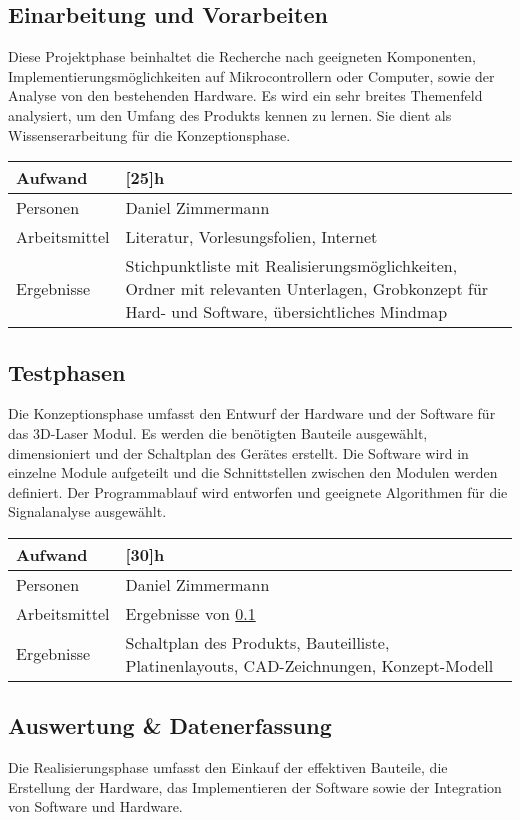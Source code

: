 \subsection{Einarbeitung und Vorarbeiten}
\label{sec:info}
Diese Projektphase beinhaltet die Recherche nach geeigneten Komponenten, Implementierungsmöglichkeiten auf Mikrocontrollern oder Computer, sowie der Analyse von den bestehenden Hardware. Es wird ein sehr breites Themenfeld analysiert, um den Umfang des Produkts kennen zu lernen. Sie dient als Wissenserarbeitung für die Konzeptionsphase. \\
\begin{tabularx}{\textwidth}{|l|X|}
	\hline
	Aufwand & [25]{h} \\ \hline
	Personen & Daniel Zimmermann \\ \hline
	Arbeitsmittel & Literatur, Vorlesungsfolien, Internet \\ \hline
	Ergebnisse & Stichpunktliste mit Realisierungsmöglichkeiten, Ordner mit relevanten Unterlagen, Grobkonzept für Hard- und Software, übersichtliches Mindmap \\ \hline
\end{tabularx}

\subsection{Testphasen}
\label{sec:Testphasen}
Die Konzeptionsphase umfasst den Entwurf der Hardware und der Software für das 3D-Laser Modul. Es werden die benötigten Bauteile ausgewählt, dimensioniert und der Schaltplan des Gerätes erstellt. Die Software wird in einzelne Module aufgeteilt und die Schnittstellen zwischen den Modulen werden definiert. Der Programmablauf wird entworfen und geeignete Algorithmen für die Signalanalyse ausgewählt.\\
\begin{tabularx}{\textwidth}{|l|X|}
	\hline
	Aufwand & [30]{h} \\\hline
	Personen & Daniel Zimmermann \\\hline
	Arbeitsmittel & Ergebnisse von \ref{sec:info} \\\hline
	Ergebnisse & Schaltplan des Produkts, Bauteilliste, Platinenlayouts, CAD-Zeichnungen, Konzept-Modell \\\hline
\end{tabularx}

\subsection{Auswertung \& Datenerfassung}
\label{sec:real}
Die Realisierungsphase umfasst den Einkauf der effektiven Bauteile, die Erstellung der Hardware, das Implementieren der Software sowie der Integration von Software und Hardware. \\

